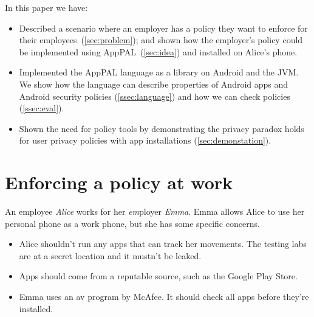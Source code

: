\documentclass[]{llncs}
\begin{document}

\noindent
In this paper we have:
\begin{itemize}
  \item
    Described a scenario where an employer has a policy they want to enforce for their employees~(\autoref{sec:problem});
    and shown how the employer's policy could be implemented using AppPAL~(\autoref{sec:idea}) and installed on Alice's phone.
  \item
    Implemented the AppPAL language as a library on Android and the JVM.
    We show how the language can describe properties of Android apps and Android security policies (\autoref{ssec:language}) and how we can check policies (\autoref{ssec:eval}).
  \item
    Shown the need for policy tools by demonstrating the privacy paradox holds for user privacy policies with app installations (\autoref{sec:demonstation}).
\end{itemize}

\section{Enforcing a policy at work}
\label{sec:problem}

An employee \emph{Alice} works for her \emph{em\/}ployer \emph{Emma}.
Emma allows Alice to use her personal phone as a work phone, but she has some specific concerns.
\begin{itemize}
  \item Alice shouldn't run any apps that can track her movements.
    The testing labs are at a secret location and it mustn't be leaked.
  \item Apps should come from a reputable source, such as the Google Play Store.
  \item Emma uses an \ac{av} program by McAfee.
    It should check all apps before they're installed.
\end{itemize}
\end{document}
